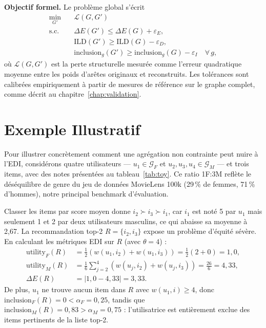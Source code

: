 \documentclass[12pt]{report}
\begin{document}
\smallskip\noindent\textbf{Objectif formel.}
Le problème global s'écrit
\begin{equation}
\begin{aligned}
  \min_{G'} \quad & \mathcal{L}(G, G') \\
  \text{s.c.} \quad
    & \Delta E(G') \leq \Delta E(G) + \varepsilon_E, \\
    & \mathrm{ILD}(G') \geq \mathrm{ILD}(G) - \varepsilon_D, \\
    & \mathrm{inclusion}_g(G') \geq \mathrm{inclusion}_g(G) - \varepsilon_I
      \quad \forall\, g,
\end{aligned}
\end{equation}
où $\mathcal{L}(G, G')$ est la perte structurelle mesurée comme l'erreur
quadratique moyenne entre les poids d'arêtes originaux et reconstruits.
Les tolérances sont calibrées empiriquement à partir de mesures de
référence sur le graphe complet, comme décrit au
chapitre~\ref{chap:validation}.

\section{Exemple Illustratif}
\label{sec:example}

Pour illustrer concrètement comment une agrégation non contrainte peut
nuire à l'EDI, considérons quatre utilisateurs --- $u_1 \in \mathcal{G}_F$
et $u_2, u_3, u_4 \in \mathcal{G}_M$ --- et trois items, avec des notes
présentées au tableau~\ref{tab:toy}. Ce ratio 1F:3M reflète le
déséquilibre de genre du jeu de données MovieLens 100k (29\,\% de femmes,
71\,\% d'hommes), notre principal benchmark d'évaluation.

Classer les items par score moyen donne $i_2 \succ i_3 \succ i_1$, car
$i_1$ est noté 5 par $u_1$ mais seulement 1 et 2 par deux utilisateurs
masculins, ce qui abaisse sa moyenne à 2,67. La recommandation top-2 $R =
\{i_2, i_3\}$ expose un problème d'équité sévère. En calculant les
métriques EDI sur $R$ (avec $\theta = 4$) :
\begin{align*}
  \mathrm{utility}_F(R) &= \tfrac{1}{2}(w(u_1,i_2)+w(u_1,i_3))
                         = \tfrac{1}{2}(2+0) = 1{,}0, \\
  \mathrm{utility}_M(R) &= \tfrac{1}{6}\sum_{j=2}^{4}(w(u_j,i_2)+w(u_j,i_3))
                         = \tfrac{26}{6} = 4{,}33, \\
  \Delta E(R) &= |1{,}0 - 4{,}33| = 3{,}33.
\end{align*}
De plus, $u_1$ ne trouve aucun item dans $R$ avec $w(u_1,i) \geq 4$, donc
$\mathrm{inclusion}_F(R) = 0 < \alpha_F = 0{,}25$, tandis que
$\mathrm{inclusion}_M(R) = 0{,}83 > \alpha_M = 0{,}75$ : l'utilisatrice
est entièrement exclue des items pertinents de la liste top-2.
\end{document}
